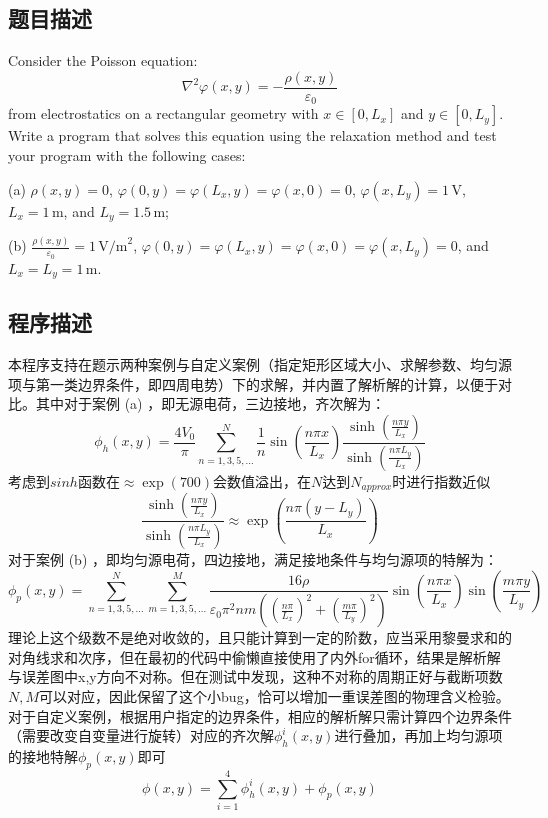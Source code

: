 \subsection{题目描述}
\noindent
Consider the Poisson equation:
\[
    \nabla^2 \varphi(x, y) = -\frac{\rho(x, y)}{\varepsilon_0}
\]
from electrostatics on a rectangular geometry with \(x \in [0, L_x]\) and \(y \in [0, L_y]\). Write a program that solves this equation using the relaxation method and test your program with the following cases:

\noindent
(a) \(\rho(x, y) = 0\), \(\varphi(0, y) = \varphi(L_x, y) = \varphi(x, 0) = 0\), \(\varphi(x, L_y) = 1 \, \text{V}\),
\(L_x = 1 \, \text{m}\), and \(L_y = 1.5 \, \text{m}\);

\noindent
(b) \(\frac{\rho(x, y)}{\varepsilon_0} = 1 \, \text{V/m}^2\), \(\varphi(0, y) = \varphi(L_x, y) = \varphi(x, 0) = \varphi(x, L_y) = 0\), and \(L_x = L_y = 1 \, \text{m}\).


\subsection{程序描述}
本程序支持在题示两种案例与自定义案例（指定矩形区域大小、求解参数、均匀源项与第一类边界条件，即四周电势）下的求解，并内置了解析解的计算，以便于对比。其中对于案例 (a) ，即无源电荷，三边接地，齐次解为：
\[
    \phi_h(x,y) = \frac{4V_0}{\pi} \sum_{n=1,3,5,\dots}^{N} \frac{1}{n} \sin\left(\frac{n\pi x}{L_x}\right) \frac{\sinh\left(\frac{n\pi y}{L_x}\right)}{\sinh\left(\frac{n\pi L_y}{L_x}\right)}
\]
考虑到$sinh$函数在$\approx \exp( 700)$会数值溢出，在$N$达到$N_{approx}$时进行指数近似
\[
    \frac{\sinh\left(\frac{n\pi y}{L_x}\right)}{\sinh\left(\frac{n\pi L_y}{L_x}\right)}
    \approx \exp\left(\frac{n\pi (y-L_y)}{L_x} \right)
\]
对于案例 (b) ，即均匀源电荷，四边接地，满足接地条件与均匀源项的特解为：
\[
    \phi_p(x,y) = \sum_{n=1,3,5,\dots}^{N} \sum_{m=1,3,5,\dots}^{M} \frac{16 \rho}{\varepsilon_0 \pi^2 n m \left( \left( \frac{n\pi}{L_x} \right)^2 + \left( \frac{m\pi}{L_y} \right)^2 \right)} \sin\left( \frac{n\pi x}{L_x} \right) \sin\left( \frac{m\pi y}{L_y} \right)
\]
理论上这个级数不是绝对收敛的，且只能计算到一定的阶数，应当采用黎曼求和的对角线求和次序，但在最初的代码中偷懒直接使用了内外for循环，结果是解析解与误差图中x,y方向不对称。但在测试中发现，这种不对称的周期正好与截断项数$N,M$可以对应，因此保留了这个小bug，恰可以增加一重误差图的物理含义检验。
对于自定义案例，根据用户指定的边界条件，相应的解析解只需计算四个边界条件（需要改变自变量进行旋转）对应的齐次解$\phi^i_h(x,y)$进行叠加，再加上均匀源项的接地特解$\phi_p(x,y)$即可
\[
    \phi(x,y) = \sum_{i=1}^{4} \phi_h^i(x,y) + \phi_p(x,y)
\]

